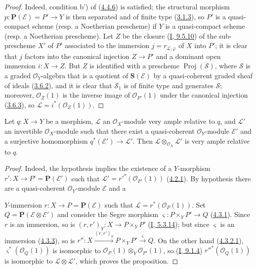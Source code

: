 \begin{proof}
Indeed, condition b') of (\hyperref[II.4.4.6]{4.4.6}) is satisfied;
the structural morphism $p:\mathbf{P}(\mathcal{E})=P'\to Y$ is then separated
and of finite type (\hyperref[II.3.1.3]{3.1.3}), so $P'$ is a
quasi-compact scheme (resp. a Noetherian prescheme) if $Y$ is a quasi-compact
scheme (resp. a Noetherian prescheme). Let $Z$ be the closure
(\hyperref[I.9.5.10]{I, 9.5.10}) of the sub-prescheme $X'$ of $P'$
associated to the immersion $j=r_{\mathcal{L},\varphi}$ of $X$ into $P'$; it
is clear that $j$ factors into the canonical injection $Z\to P'$ and a
dominant open immersion $i:X\to Z$. But $Z$ is identified with a prescheme
$\operatorname{Proj}(\mathcal{S})$, where $\mathcal{S}$ is a graded
$\mathcal{O}_Y$-algebra that is a quotient of $\mathbf{S}(\mathcal{E})$ by a
quasi-coherent graded sheaf of ideals
(\hyperref[II.3.6.2]{3.6.2}), and it is clear that $\mathcal{S}_1$ is of
finite type and generates $\mathcal{S}$; moreover, $\mathcal{O}_Z(1)$ is the
inverse image of $\mathcal{O}_{P'}(1)$ under the canonical injection
(\hyperref[II.3.6.3]{3.6.3}), so
$\mathcal{L}=i^*(\mathcal{O}_Z(1))$.
\end{proof}

\begin{proposition}[4.4.8]
\label{II.4.4.8}
Let $q:X\to Y$ be a morphism, $\mathcal{L}$ an $\mathcal{O}_X$-module very
ample relative to $q$, and $\mathcal{L}'$ an invertible $\mathcal{O}_X$-module
such that there exist a quasi-coherent $\mathcal{O}_Y$-module $\mathcal{E}'$
and a surjective homomorphism $q^*(\mathcal{E}')\to\mathcal{L}'$. Then
$\mathcal{L}\otimes_{\mathcal{O}_X}\mathcal{L}'$ is very ample relative
to $q$.
\end{proposition}

\begin{proof}
Indeed, the hypothesis implies the existence of a $Y$-morphism
$r':X\to P'=\mathbf{P}(\mathcal{E}')$ such that
$\mathcal{L}'=r'^*(\mathcal{O}_{P'}(1))$
(\hyperref[II.4.2.1]{4.2.1}). By hypothesis there are a quasi-coherent
$\mathcal{O}_Y$-module $\mathcal{E}$ and a


$Y$-immersion $r:X\to P=\mathbf{P}(\mathcal{E})$ such that
$\mathcal{L}=r^*(\mathcal{O}_P(1))$. Set
$Q=\mathbf{P}(\mathcal{E}\otimes\mathcal{E}')$ and consider the Segre
morphism $\varsigma:P\times_YP'\to Q$ (\hyperref[II.4.3.1]{4.3.1}). Since
$r$ is an immersion, so is
$(r,r')_Y:X\to P\times_YP'$ (\hyperref[I.5.3.14]{I, 5.3.14}); but since
$\varsigma$ is an immersion (\hyperref[II.4.3.3]{4.3.3}), so is
$r'':X\xrightarrow{(r,r')_Y}P\times_YP'\xrightarrow{\varsigma}Q$. On the other
hand (\hyperref[II.4.3.2.1]{4.3.2.1}),
$\varsigma^*(\mathcal{O}_Q(1))$ is isomorphic to
$\mathcal{O}_P(1)\otimes_Y\mathcal{O}_{P'}(1)$, so
(\hyperref[I.9.1.4]{I, 9.1.4}) $r''^*(\mathcal{O}_Q(1))$ is isomorphic to
$\mathcal{L}\otimes\mathcal{L}'$, which proves the proposition.
\end{proof}


